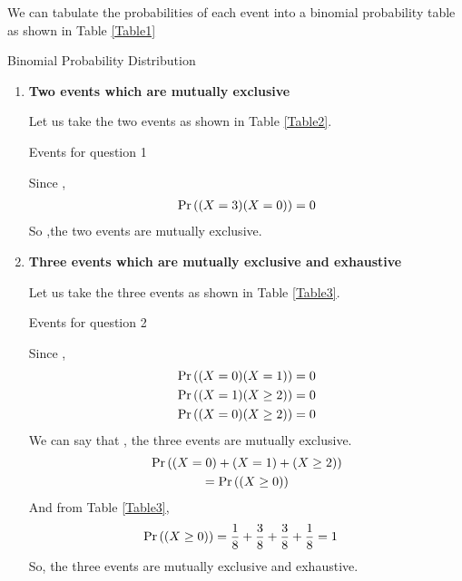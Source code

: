 \documentclass[journal,12pt,twocolumn]{IEEEtran}
\begin{document}
We can tabulate the probabilities of each event into a binomial probability table as shown in Table \ref{Table1}
\begin{table}[ht!]
\def\arraystretch{1.75}
        
        \caption{Binomial Probability Distribution}
        \label{Table1}
    \end{table}
\begin{enumerate}[label=(\roman*)]
    \item 
    \textbf{Two events which are mutually exclusive} 
    
    Let us take the two events as shown in Table \ref{Table2}.
    \begin{table}[ht!]
    \def\arraystretch{1.75}
        
        \caption{Events for question 1}
        \label{Table2}
    \end{table}
    
    Since ,
    \begin{align}
        \Pr\left((X=3)(X=0)\right) = 0
    \end{align}
    So ,the two events are mutually exclusive.
  
    \item \textbf{Three events which are mutually exclusive and exhaustive}
    
    Let us take the three events as shown in Table \ref{Table3}.
    \begin{table}[ht!]
    \def\arraystretch{1.75}
        
        \caption{Events for question 2}
        \label{Table3}
    \end{table}
    
    Since , 
    \begin{align}
        \Pr\left((X=0)(X=1)\right) &= 0 \\
        \Pr\left((X=1)(X \ge 2)\right) &= 0 \\
        \Pr\left((X=0)(X \ge 2)\right) &= 0
    \end{align}
    We can say that , the three events are mutually exclusive. 
    \begin{multline}
        \Pr\left((X=0) + (X=1) + (X \ge 2)\right) \\ = \Pr\left((X \ge 0)\right)
    \end{multline}
    And from Table \ref{Table3},    
    \begin{align}
        \Pr\left((X \ge 0)\right) &= \dfrac{1}{8}+\dfrac{3}{8}+\dfrac{3}{8}+\dfrac{1}{8} = 1
    \end{align}  
    So, the three events  are mutually exclusive and exhaustive.
    

\end{enumerate}
\end{document}
